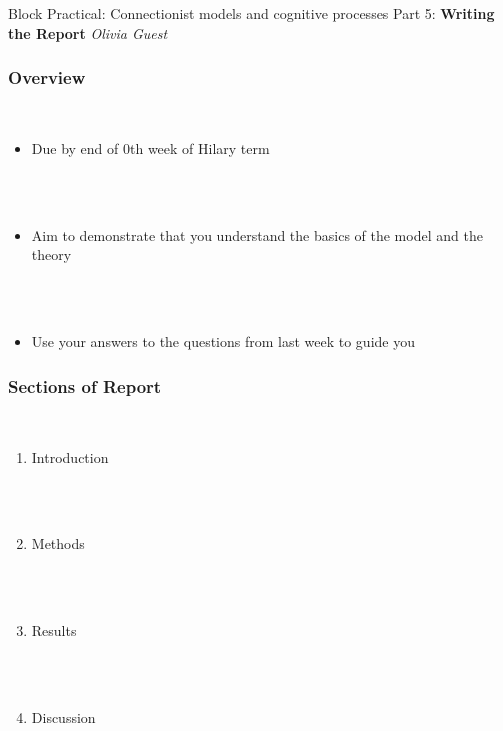 \documentclass{beamer}
\begin{document}
\begin{frame}[fragile]

\centering\Huge Block Practical: Connectionist models and cognitive processes
\vfill \huge
\centering Part 5: \textbf{Writing the Report} \large
\vfill
\textit{
Olivia Guest }

\end{frame}


\begin{frame}[fragile]
\frametitle{Overview}
        \  \\

\begin{itemize}[<+->]
\item Due by end of 0th week of Hilary term

\ \\

\ \\

 \item Aim to demonstrate that you understand the basics of the model and the theory
 
\ \\

 \ \\
 
\item Use your answers to the questions from last week to guide you


\end{itemize}


\end{frame}


\begin{frame}[fragile]
\frametitle{Sections of Report}

        \  \\

\begin{enumerate}[<+->]
\item Introduction

\ \\

\ \\

\item Methods

\ \\

\ \\

\item Results

\ \\

\ \\

\item Discussion


\end{enumerate}


\end{frame}
\end{document}
